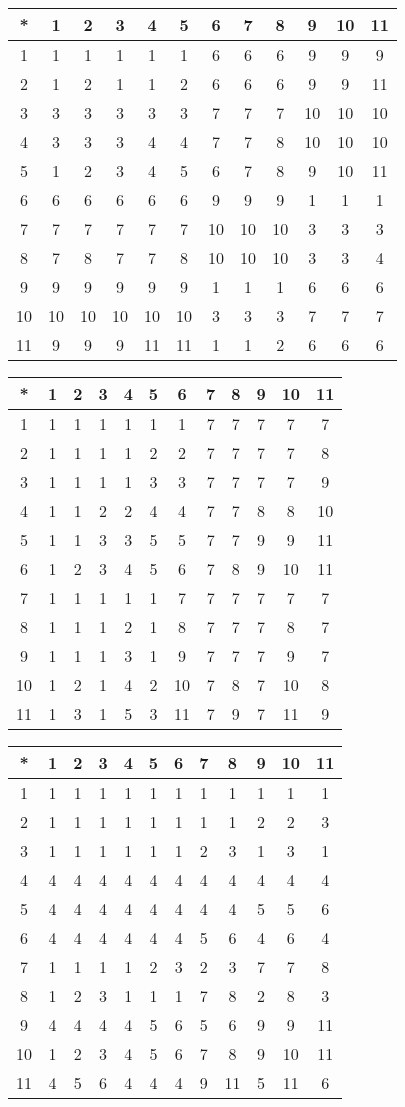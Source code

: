 \begin{tabular}[t]{c|ccccccccccc}
*&1&2&3&4&5&6&7&8&9&10&11 \\ \hline
    1&1&1&1&1&1&6&6&6&9&9&9 \\
    2&1&2&1&1&2&6&6&6&9&9&11 \\
    3&3&3&3&3&3&7&7&7&10&10&10 \\
    4&3&3&3&4&4&7&7&8&10&10&10 \\
    5&1&2&3&4&5&6&7&8&9&10&11 \\
    6&6&6&6&6&6&9&9&9&1&1&1 \\
    7&7&7&7&7&7&10&10&10&3&3&3 \\
    8&7&8&7&7&8&10&10&10&3&3&4 \\
    9&9&9&9&9&9&1&1&1&6&6&6 \\
    10&10&10&10&10&10&3&3&3&7&7&7 \\
    11&9&9&9&11&11&1&1&2&6&6&6 
\end{tabular}


\begin{tabular}[t]{c|ccccccccccc}
*&1&2&3&4&5&6&7&8&9&10&11 \\ \hline
    1&1&1&1&1&1&1&7&7&7&7&7 \\
    2&1&1&1&1&2&2&7&7&7&7&8 \\
    3&1&1&1&1&3&3&7&7&7&7&9 \\
    4&1&1&2&2&4&4&7&7&8&8&10 \\
    5&1&1&3&3&5&5&7&7&9&9&11 \\
    6&1&2&3&4&5&6&7&8&9&10&11 \\
    7&1&1&1&1&1&7&7&7&7&7&7 \\
    8&1&1&1&2&1&8&7&7&7&8&7 \\
    9&1&1&1&3&1&9&7&7&7&9&7 \\
    10&1&2&1&4&2&10&7&8&7&10&8 \\
    11&1&3&1&5&3&11&7&9&7&11&9 
\end{tabular}


\begin{tabular}[t]{c|ccccccccccc}
*&1&2&3&4&5&6&7&8&9&10&11 \\ \hline
    1&1&1&1&1&1&1&1&1&1&1&1 \\
    2&1&1&1&1&1&1&1&1&2&2&3 \\
    3&1&1&1&1&1&1&2&3&1&3&1 \\
    4&4&4&4&4&4&4&4&4&4&4&4 \\
    5&4&4&4&4&4&4&4&4&5&5&6 \\
    6&4&4&4&4&4&4&5&6&4&6&4 \\
    7&1&1&1&1&2&3&2&3&7&7&8 \\
    8&1&2&3&1&1&1&7&8&2&8&3 \\
    9&4&4&4&4&5&6&5&6&9&9&11 \\
    10&1&2&3&4&5&6&7&8&9&10&11 \\
    11&4&5&6&4&4&4&9&11&5&11&6 
\end{tabular}


